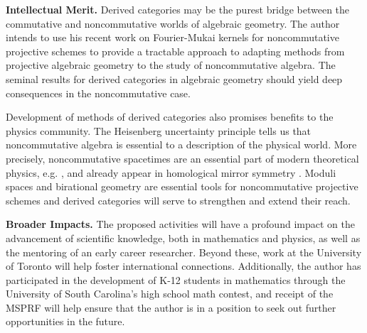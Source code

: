 \documentclass[11pt]{article}
\begin{document}



\noindent\textbf{Intellectual Merit.}
Derived categories may be the purest bridge between the commutative and noncommutative worlds of algebraic geometry.
The author intends to use his recent work on Fourier-Mukai kernels for noncommutative projective schemes to provide a tractable approach to adapting methods from projective algebraic geometry to the study of noncommutative algebra.
The seminal results for derived categories in algebraic geometry should yield deep consequences in the noncommutative case.

Development of methods of derived categories also promises benefits to the physics community.
The Heisenberg uncertainty principle tells us that noncommutative algebra is essential to a description of the physical world.
More precisely, noncommutative spacetimes are an essential part of modern theoretical physics, e.g. \cite{DoNe01}, and already appear in homological mirror symmetry \cite{AKO08}.
Moduli spaces and birational geometry are essential tools for noncommutative projective schemes and derived categories will serve to strengthen and extend their reach.

\noindent\textbf{Broader Impacts.}
The proposed activities will have a profound impact on the advancement of scientific knowledge, both in mathematics and physics, as well as the mentoring of an early career researcher.
Beyond these, work at the University of Toronto will help foster international connections.
Additionally, the author has participated in the development of K-12 students in mathematics through the University of South Carolina's high school math contest, and receipt of the MSPRF will help ensure that the author is in a position to seek out further opportunities in the future.

\end{document}
